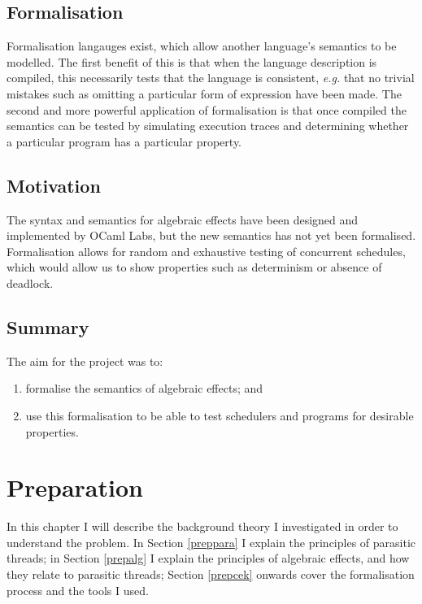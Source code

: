 \documentclass[12pt,a4paper,twoside,openright]{report}
\begin{document}
\section{Formalisation}

Formalisation langauges exist, which allow another language's semantics to be modelled. The first benefit of this is that when the language description is compiled, this necessarily tests that the language is consistent, \textit{e.g.} that no trivial mistakes such as omitting a particular form of expression have been made. The second and more powerful application of formalisation is that once compiled the semantics can be tested by simulating execution traces and determining whether a particular program has a particular property.

\section{Motivation}

The syntax and semantics for algebraic effects have been designed and implemented by OCaml Labs, but the new semantics has not yet been formalised. Formalisation allows for random and exhaustive testing of concurrent schedules, which would allow us to show properties such as determinism or absence of deadlock.

\section{Summary}

The aim for the project was to:

\begin{enumerate}[label=(\alph*)]
\item formalise the semantics of algebraic effects; and
\item use this formalisation to be able to test schedulers and programs for desirable properties.
\end{enumerate}

\chapter{Preparation}

In this chapter I will describe the background theory I investigated in order to understand the problem. In Section \ref{preppara} I explain the principles of parasitic threads; in Section \ref{prepalg} I explain the principles of algebraic effects, and how they relate to parasitic threads; Section \ref{prepcek} onwards cover the formalisation process and the tools I used.
\end{document}
